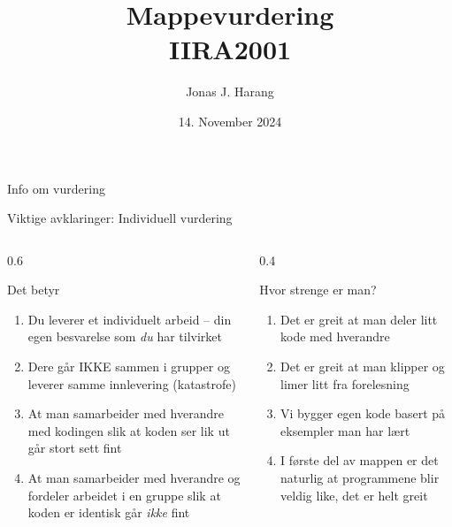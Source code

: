 \documentclass[aspectratio=169]{beamer}
\title[rl]{Mappevurdering \\ IIRA2001}
\date{14. November 2024}
\author{Jonas J. Harang}
\begin{document}
\begin{frame}
\maketitle
\end{frame}

\begin{frame}{Info om vurdering}
\end{frame}

\begin{frame}{Viktige avklaringer: Individuell vurdering}
   \huge \color{red}{Mappevurderingen og innleveringen er Individuell}
   \small 

   \color{black}
   \begin{columns}
      \begin{column}{0.6\textwidth}
         \begin{block}{Det betyr}
            \begin{enumerate}[$\bullet$]
               \item {Du leverer et individuelt arbeid -- din egen besvarelse som \textit{du} har tilvirket}
               \item {Dere går IKKE sammen i grupper og leverer samme innlevering (katastrofe)}
               \item {At man samarbeider med hverandre med kodingen slik at koden ser lik ut går stort sett fint}
               \item {At man samarbeider med hverandre og fordeler arbeidet i en gruppe slik at koden er identisk går \textit{ikke} fint}
            \end{enumerate}
         \end{block}
      \end{column}
      
      \begin{column}{0.4\textwidth}
         \begin{block}{Hvor strenge er man?}
            \begin{enumerate}[$\bullet$]
               \item {Det er greit at man deler litt kode med hverandre}
               \item {Det er greit at man klipper og limer litt fra forelesning}
               \item {Vi bygger egen kode basert på eksempler man har lært}
               \item {I første del av mappen er det naturlig at programmene blir veldig like, det er helt greit}
            \end{enumerate}
         \end{block}
      \end{column}
   \end{columns}
\end{frame}
\end{document}
